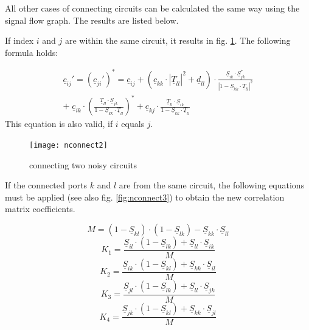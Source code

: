 All other cases of connecting circuits can be calculated the same way
using the signal flow graph.  The results are listed below.

\addvspace{12pt}

If index $i$ and $j$ are within the same circuit, it results in
fig. \ref{fig:nconnect2}.  The following formula holds:

\begin{equation}
\begin{split}
\underline{c}_{ij}' = (\underline{c}_{ji}')^* = \underline{c}_{ij} +
   (\underline{c}_{kk}\cdot|\underline{T}_{ll}|^2 + \underline{d}_{ll})\cdot
   \frac{\underline{S}_{ik}\cdot\underline{S}_{jk}^*}{|1-\underline{S}_{kk}\cdot\underline{T}_{ll}|^2}
\\ + \;\underline{c}_{ik}\cdot
     \left(\frac{\underline{T}_{ll}\cdot\underline{S}_{jk}}
                {1-\underline{S}_{kk}\cdot\underline{T}_{ll}}\right)^*
   + \underline{c}_{kj}\cdot
     \frac{\underline{T}_{ll}\cdot\underline{S}_{ik}}{1-\underline{S}_{kk}\cdot\underline{T}_{ll}}
\end{split}
\end{equation}
This equation is also valid, if $i$ equals $j$.

\begin{figure}[ht]
\begin{center}
\texttt{[image: nconnect2]}
\end{center}
\caption{connecting two noisy circuits}
\label{fig:nconnect2}
\end{figure}
\FloatBarrier


If the connected ports $k$ and $l$ are from the same circuit, the
following equations must be applied (see also
fig. \ref{fig:nconnect3}) to obtain the new correlation matrix
coefficients.

\begin{equation}
M = (1-\underline{S}_{kl})\cdot(1-\underline{S}_{lk}) - \underline{S}_{kk}\cdot\underline{S}_{ll}
\end{equation}
\begin{equation}
K_1 = \frac{\underline{S}_{il}\cdot(1-\underline{S}_{lk}) + \underline{S}_{ll}\cdot\underline{S}_{ik}} {M}
\end{equation}
\begin{equation}
K_2 = \frac{\underline{S}_{ik}\cdot(1-\underline{S}_{kl}) + \underline{S}_{kk}\cdot\underline{S}_{il}} {M}
\end{equation}
\begin{equation}
K_3 = \frac{\underline{S}_{jl}\cdot(1-\underline{S}_{lk}) + \underline{S}_{ll}\cdot\underline{S}_{jk}} {M}
\end{equation}
\begin{equation}
K_4 = \frac{\underline{S}_{jk}\cdot(1-\underline{S}_{kl}) + \underline{S}_{kk}\cdot\underline{S}_{jl}} {M}
\end{equation}

